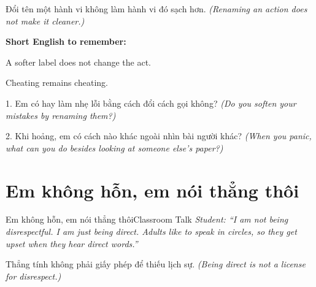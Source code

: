 \begin{baihoc}
Đổi tên một hành vi không làm hành vi đó sạch hơn.
\textit{(Renaming an action does not make it cleaner.)}
\end{baihoc}

\begin{ghinhoanh}
\textbf{Short English to remember:}

A softer label does not change the act.

Cheating remains cheating.
\end{ghinhoanh}

\begin{tuhocnhanh}
1. Em có hay làm nhẹ lỗi bằng cách đổi cách gọi không? \textit{(Do you soften your mistakes by renaming them?)}

2. Khi hoảng, em có cách nào khác ngoài nhìn bài người khác? \textit{(When you panic, what can you do besides looking at someone else’s paper?)}
\end{tuhocnhanh}
\ngancach

\section{Em không hỗn, em nói thẳng thôi}
\begin{truyen}{Em không hỗn, em nói thẳng thôi}{Classroom Talk}
\textit{Student: ``I am not being disrespectful. I am just being direct. Adults like to speak in circles, so they get upset when they hear direct words.''}\\[4pt]



\end{truyen}

\begin{baihoc}
Thẳng tính không phải giấy phép để thiếu lịch sự.
\textit{(Being direct is not a license for disrespect.)}
\end{baihoc}

